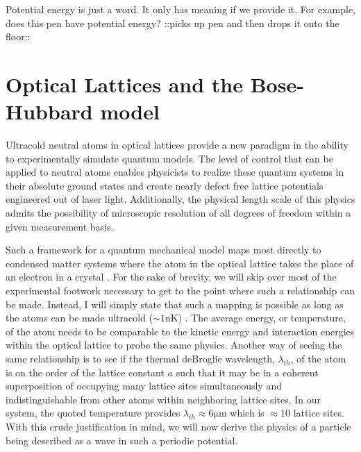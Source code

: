 
\begin{savequote}[75mm]
Potential energy is just a word. It only has meaning if we provide it. For example, does this pen have potential energy?\newline
::picks up pen and then drops it onto the floor::
\end{savequote}


\chapter{Optical Lattices and \newline the Bose-Hubbard model}
\label{sec:ch1}


Ultracold neutral atoms in optical lattices provide a new paradigm in the ability to experimentally simulate quantum models. The level of control that can be applied to neutral atoms enables physicists to realize these quantum systems in their absolute ground states and create nearly defect free lattice potentials engineered out of laser light. Additionally, the physical length scale of this physics admits the possibility of microscopic resolution of all degrees of freedom within a given measurement basis. 

Such a framework for a quantum mechanical model maps most directly to condensed matter systems where the atom in the optical lattice takes the place of an electron in a crystal \cite{Jaksch1998}. For the sake of brevity, we will skip over most of the experimental footwork necessary to get to the point where such a relationship can be made. Instead, I will simply state that such a mapping is possible as long as the atoms can be made ultracold ($\sim 1\mathrm{nK}$) \cite{Bakr2010,Bakr2011,Preiss2015}. The average energy, or temperature, of the atom needs to be comparable to the kinetic energy and interaction energies within the optical lattice to probe the same physics. Another way of seeing the same relationship is to see if the thermal deBroglie wavelength, $\lambda_{th}$, of the atom is on the order of the lattice constant $a$ such that it may be in a coherent superposition of occupying many lattice sites simultaneously and indistinguishable from other atoms within neighboring lattice sites. In our system, the quoted temperature provides $\lambda_{th} \approx 6 \mathrm{\mu m} $ which is $\approx 10$ lattice sites. With this crude justification in mind, we will now derive the physics of a particle being described as a wave in such a periodic potential.

